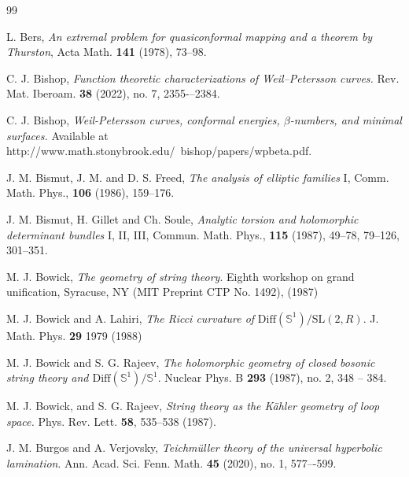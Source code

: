 \documentclass[12pt]{amsart}
\theoremstyle{plain}
\theoremstyle{definition}
\theoremstyle{remark}
\numberwithin{equation}{section} %
\numberwithin{figure}{section} %
\begin{document}
\begin{thebibliography}{99}
  
  L. Bers, {\it An extremal problem for quasiconformal mapping and a theorem by Thurston}, Acta Math. {\bf 141} (1978), 73--98.




 C. J. Bishop,  {\it Function theoretic characterizations of Weil–Petersson curves.} Rev. Mat. Iberoam. {\bf 38} (2022), no. 7, 2355-–2384.

 C. J. Bishop, {\it Weil-Petersson curves, conformal energies, $\beta$-numbers, and minimal surfaces.} Available at http://www.math.stonybrook.edu/~bishop/papers/wpbeta.pdf.

 J. M. Bismut, J. M. and D. S. Freed, {\it The analysis of elliptic families} I, Comm. Math. Phys., {\bf 106} (1986), 159--176.

 J. M. Bismut, H. Gillet and Ch. Soule, {\it Analytic torsion and holomorphic determinant bundles} I, II, III, Commun. Math. Phys., {\bf 115} (1987), 49--78, 79--126, 301--351.


 M. J. Bowick, {\it The geometry of string theory}. Eighth workshop on grand unification, Syracuse,
NY (MIT Preprint CTP No. 1492), (1987)


 M. J. Bowick and A. Lahiri, {\it The Ricci curvature of} $\mathrm{Diff}(\mathbb{S}^1) /\mathrm{SL}(2, R)$. J. Math. Phys. {\bf 29} 1979 (1988)

  M. J. Bowick and S. G. Rajeev,  \textit{The holomorphic geometry of closed bosonic string theory and
$\text{Diff}(\mathbb{S}^1)/\mathbb{S}^1$}. Nuclear Phys. B {\bf 293} (1987), no. 2, 348 -- 384.

 M. J. Bowick,  and S. G. Rajeev, {\it String theory as the K\"ahler geometry of loop space.} Phys. Rev. Lett. {\bf 58},
535--538 (1987).


 J. M. Burgos and A. Verjovsky, 
{\it Teichm\"uller theory of the universal hyperbolic lamination}. 
Ann. Acad. Sci. Fenn. Math. {\bf 45} (2020), no. 1, 577–-599. 



\end{thebibliography}
\end{document}
